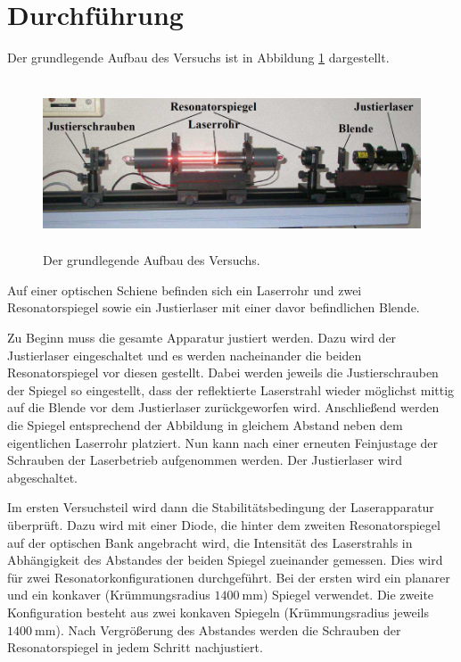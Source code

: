\section{Durchführung}
\label{sec:Durchführung}

Der grundlegende Aufbau des Versuchs ist in Abbildung \ref{fig:aufbau} dargestellt.

\begin{figure}[H]
  \centering
  \includegraphics[height=5cm]{Aufbau.PNG}
  \caption{Der grundlegende Aufbau des Versuchs. \cite{sample}}
  \label{fig:aufbau}
\end{figure}

Auf einer optischen Schiene befinden sich ein Laserrohr und zwei Resonatorspiegel
sowie ein Justierlaser mit einer davor befindlichen Blende.

Zu Beginn muss die gesamte Apparatur justiert werden. Dazu wird der Justierlaser
eingeschaltet und es werden nacheinander die beiden Resonatorspiegel vor diesen
gestellt. Dabei werden jeweils die Justierschrauben der Spiegel so eingestellt,
dass der reflektierte Laserstrahl wieder möglichst mittig auf die Blende vor dem
Justierlaser zurückgeworfen wird. Anschließend werden die Spiegel entsprechend
der Abbildung in gleichem Abstand neben dem eigentlichen Laserrohr platziert. Nun kann nach einer
erneuten Feinjustage der Schrauben der Laserbetrieb aufgenommen werden. Der Justierlaser
wird abgeschaltet.

Im ersten Versuchsteil wird dann die Stabilitätsbedingung der Laserapparatur überprüft.
Dazu wird mit einer Diode, die hinter dem zweiten Resonatorspiegel auf der optischen
Bank angebracht wird, die Intensität des Laserstrahls in Abhängigkeit des Abstandes
der beiden Spiegel zueinander gemessen. Dies wird für zwei Resonatorkonfigurationen
durchgeführt. Bei der ersten wird ein planarer und ein konkaver (Krümmungsradius $\SI{1400}{\milli\meter}$)
Spiegel verwendet. Die zweite Konfiguration besteht aus zwei konkaven Spiegeln
(Krümmungsradius jeweils $\SI{1400}{\milli\meter}$). Nach Vergrößerung des Abstandes
werden die Schrauben der Resonatorspiegel in jedem Schritt nachjustiert.

